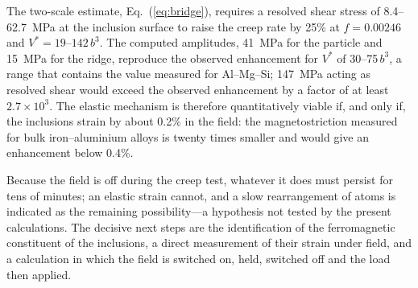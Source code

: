 The two-scale estimate, Eq.~(\ref{eq:bridge}), requires a resolved shear
stress of 8.4--62.7~MPa at the inclusion surface to raise the creep rate by
25\% at $f=0.00246$ and $V^{*}=19$--$142\,b^{3}$. The computed amplitudes,
41~MPa for the particle and 15~MPa for the ridge, reproduce the
observed enhancement for $V^{*}$ of 30--75$\,b^{3}$, a range
that contains the value measured for Al--Mg--Si; 147~MPa acting as resolved
shear would exceed the observed enhancement by a factor of at least
$2.7\times10^{3}$. The elastic mechanism is therefore quantitatively viable
if, and only if, the inclusions strain by about 0.2\% in the field: the
magnetostriction measured for bulk iron--aluminium alloys is twenty times
smaller and would give an enhancement below 0.4\%.

Because the field is off during the creep test, whatever it does must persist
for tens of minutes; an elastic strain cannot, and a slow rearrangement of
atoms is indicated as the remaining possibility---a hypothesis not tested by
the present calculations. The decisive next steps are the identification of
the ferromagnetic constituent of the inclusions, a direct measurement of their
strain under field, and a calculation in which the field is switched on, held,
switched off and the load then applied.
